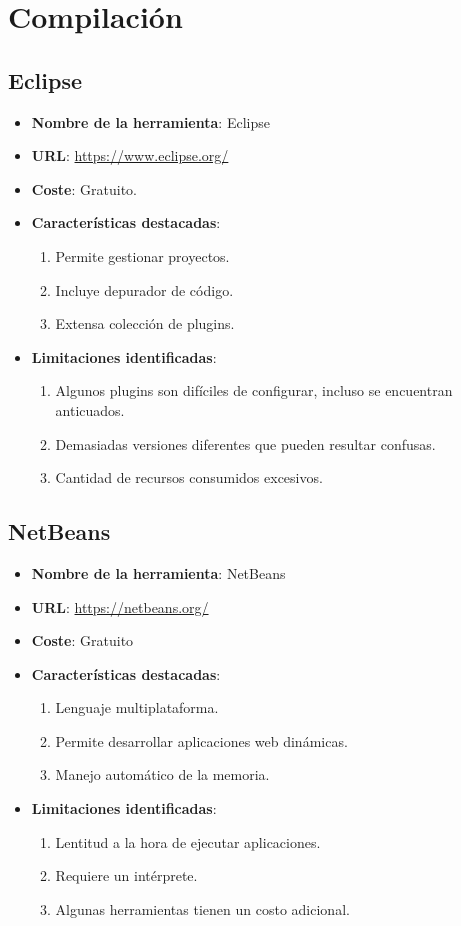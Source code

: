 \section{Compilación}

\subsection{Eclipse}

\begin{itemize}
	\item \textbf{Nombre de la herramienta}: Eclipse
	\item \textbf{URL}: \url{https://www.eclipse.org/}
	\item \textbf{Coste}: Gratuito.
	\item \textbf{Características destacadas}:
	\begin{enumerate}
		\item Permite gestionar proyectos.
		\item Incluye depurador de código.
		\item Extensa colección de plugins.
	\end{enumerate}
	\item \textbf{Limitaciones identificadas}:
	\begin{enumerate}
		\item Algunos plugins son difíciles de configurar, incluso se encuentran anticuados.
		\item Demasiadas versiones diferentes que pueden resultar confusas.
		\item Cantidad de recursos consumidos excesivos.
	\end{enumerate}
\end{itemize}

\subsection{NetBeans}

\begin{itemize}
	\item \textbf{Nombre de la herramienta}: NetBeans
	\item \textbf{URL}: \url{https://netbeans.org/} 
	\item \textbf{Coste}: Gratuito
	\item \textbf{Características destacadas}:
	\begin{enumerate}
		\item Lenguaje multiplataforma.
		\item Permite desarrollar aplicaciones web dinámicas.
		\item Manejo automático de la memoria.
	\end{enumerate}
	\item \textbf{Limitaciones identificadas}:
	\begin{enumerate}
		\item Lentitud a la hora de ejecutar aplicaciones.
		\item Requiere un intérprete.
		\item Algunas herramientas tienen un costo adicional.
	\end{enumerate}
\end{itemize}

